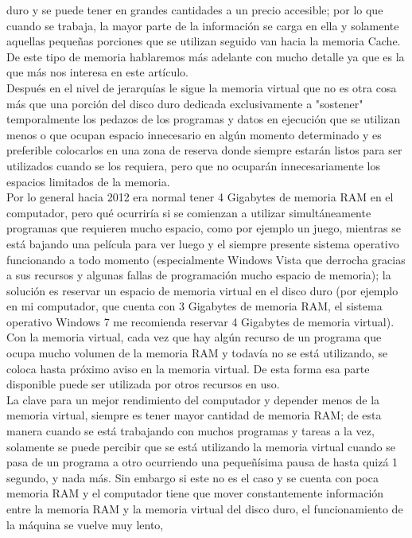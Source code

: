 \documentclass{article}
\begin{document}
duro y se puede tener en grandes cantidades a un precio accesible; por lo que cuando se trabaja,
la mayor parte de la información se carga en ella y solamente aquellas pequeñas porciones que
se utilizan seguido van hacia la memoria Cache. De este tipo de memoria hablaremos más
adelante con mucho detalle ya que es la que más nos interesa en este artículo.\\[0.1cm]
Después en el nivel de jerarquías le sigue la memoria virtual que no es otra cosa más que una
porción del disco duro dedicada exclusivamente a "sostener" temporalmente los pedazos de los
programas y datos en ejecución que se utilizan menos o que ocupan espacio innecesario en
algún momento determinado y es preferible colocarlos en una zona de reserva donde siempre
estarán listos para ser utilizados cuando se los requiera, pero que no ocuparán
innecesariamente los espacios limitados de la memoria.\\[0.1cm]
Por lo general hacia 2012 era normal tener 4 Gigabytes de memoria RAM en el computador,
pero qué ocurriría si se comienzan a utilizar simultáneamente programas que requieren mucho
espacio, como por ejemplo un juego, mientras se está bajando una película para ver luego y el
siempre presente sistema operativo funcionando a todo momento (especialmente Windows
Vista que derrocha gracias a sus recursos y algunas fallas de programación mucho espacio de
memoria); la solución es reservar un espacio de memoria virtual en el disco duro (por ejemplo
en mi computador, que cuenta con 3 Gigabytes de memoria RAM, el sistema operativo Windows
7 me recomienda reservar 4 Gigabytes de memoria virtual). Con la memoria virtual, cada vez
que hay algún recurso de un programa que ocupa mucho volumen de la memoria RAM y todavía
no se está utilizando, se coloca hasta próximo aviso en la memoria virtual. De esta forma esa
parte disponible puede ser utilizada por otros recursos en uso.\\[0.1cm]
La clave para un mejor rendimiento del computador y depender menos de la memoria virtual,
siempre es tener mayor cantidad de memoria RAM; de esta manera cuando se está trabajando
con muchos programas y tareas a la vez, solamente se puede percibir que se está utilizando la
memoria virtual cuando se pasa de un programa a otro ocurriendo una pequeñísima pausa de
hasta quizá 1 segundo, y nada más. Sin embargo si este no es el caso y se cuenta con poca
memoria RAM y el computador tiene que mover constantemente información entre la memoria
RAM y la memoria virtual del disco duro, el funcionamiento de la máquina se vuelve muy lento,
\end{document}
